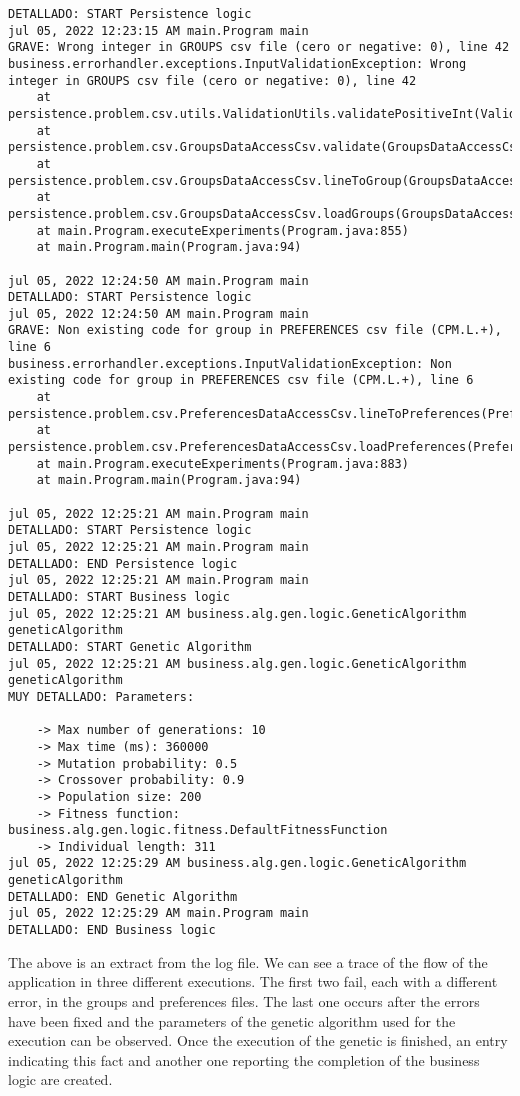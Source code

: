 \begin{lstlisting}[basicstyle=\tiny]
DETALLADO: START Persistence logic
jul 05, 2022 12:23:15 AM main.Program main
GRAVE: Wrong integer in GROUPS csv file (cero or negative: 0), line 42
business.errorhandler.exceptions.InputValidationException: Wrong integer in GROUPS csv file (cero or negative: 0), line 42
	at persistence.problem.csv.utils.ValidationUtils.validatePositiveInt(ValidationUtils.java:56)
	at persistence.problem.csv.GroupsDataAccessCsv.validate(GroupsDataAccessCsv.java:106)
	at persistence.problem.csv.GroupsDataAccessCsv.lineToGroup(GroupsDataAccessCsv.java:51)
	at persistence.problem.csv.GroupsDataAccessCsv.loadGroups(GroupsDataAccessCsv.java:29)
	at main.Program.executeExperiments(Program.java:855)
	at main.Program.main(Program.java:94)

jul 05, 2022 12:24:50 AM main.Program main
DETALLADO: START Persistence logic
jul 05, 2022 12:24:50 AM main.Program main
GRAVE: Non existing code for group in PREFERENCES csv file (CPM.L.+), line 6
business.errorhandler.exceptions.InputValidationException: Non existing code for group in PREFERENCES csv file (CPM.L.+), line 6
	at persistence.problem.csv.PreferencesDataAccessCsv.lineToPreferences(PreferencesDataAccessCsv.java:97)
	at persistence.problem.csv.PreferencesDataAccessCsv.loadPreferences(PreferencesDataAccessCsv.java:34)
	at main.Program.executeExperiments(Program.java:883)
	at main.Program.main(Program.java:94)

jul 05, 2022 12:25:21 AM main.Program main
DETALLADO: START Persistence logic
jul 05, 2022 12:25:21 AM main.Program main
DETALLADO: END Persistence logic
jul 05, 2022 12:25:21 AM main.Program main
DETALLADO: START Business logic
jul 05, 2022 12:25:21 AM business.alg.gen.logic.GeneticAlgorithm geneticAlgorithm
DETALLADO: START Genetic Algorithm
jul 05, 2022 12:25:21 AM business.alg.gen.logic.GeneticAlgorithm geneticAlgorithm
MUY DETALLADO: Parameters:

	-> Max number of generations: 10
	-> Max time (ms): 360000
	-> Mutation probability: 0.5
	-> Crossover probability: 0.9
	-> Population size: 200
	-> Fitness function: business.alg.gen.logic.fitness.DefaultFitnessFunction
	-> Individual length: 311
jul 05, 2022 12:25:29 AM business.alg.gen.logic.GeneticAlgorithm geneticAlgorithm
DETALLADO: END Genetic Algorithm
jul 05, 2022 12:25:29 AM main.Program main
DETALLADO: END Business logic
\end{lstlisting}

The above is an extract from the log file. We can see a trace of the flow of the application in three different executions. The first two fail, each with a different error, in the groups and preferences files. The last one occurs after the errors have been fixed and the parameters of the genetic algorithm used for the execution can be observed. Once the execution of the genetic is finished, an entry indicating this fact and another one reporting the completion of the business logic are created.



